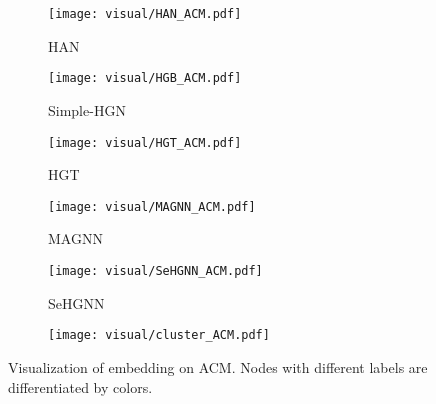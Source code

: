 \begin{figure*}[!t]
    \centering
    \begin{flushleft}
	\begin{subfigure}[t]{0.16\linewidth}
		\texttt{[image: visual/HAN\_ACM.pdf]}
		\caption{HAN}
	\end{subfigure}
         \begin{subfigure}[t]{0.16\linewidth}
		\texttt{[image: visual/HGB\_ACM.pdf]}
		\caption{Simple-HGN}
	\end{subfigure}
	\begin{subfigure}[t]{0.16\linewidth}
		\texttt{[image: visual/HGT\_ACM.pdf]}
		\caption{HGT}
	\end{subfigure}
        \begin{subfigure}[t]{0.16\linewidth}
		\texttt{[image: visual/MAGNN\_ACM.pdf]}
		\caption{MAGNN}
	\end{subfigure}
        \begin{subfigure}[t]{0.16\linewidth}
		\texttt{[image: visual/SeHGNN\_ACM.pdf]}
		\caption{SeHGNN}
	\end{subfigure}
        \begin{subfigure}[t]{0.16\linewidth}
		\texttt{[image: visual/cluster\_ACM.pdf]}
		\caption{\alg}
	\end{subfigure}
	\caption{Visualization of embedding on ACM. Nodes with different labels are differentiated by colors.}
	\label{fig:ablation}
    \end{flushleft}
\end{figure*}

